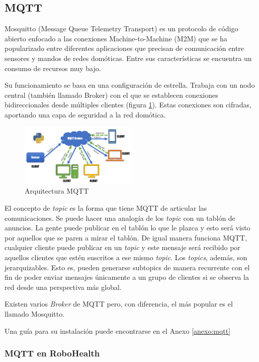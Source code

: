 \subsection{MQTT}

Mosquitto (Message Queue Telemetry Transport) es un protocolo de código abierto enfocado a las conexiones Machine-to-Machine (M2M) \cite{Vega:2016} que se ha popularizado entre diferentes aplicaciones que precisan de comunicación entre sensores y mandos de redes domóticas. Entre sus características se encuentra un consumo de recursos muy bajo.

Su funcionamiento se basa en una configuración de estrella. Trabaja con un nodo central (también llamado Broker) con el que se establecen conexiones bidireccionales desde múltiples clientes (figura \ref{fig:mqtt}). Estas conexiones son cifradas, aportando una capa de seguridad a la red domótica.

\begin{figure}[b]
\centering
\includegraphics[width=0.5\textwidth]{figuras/mqtt.png}
\caption{Arquitectura MQTT}
\label{fig:mqtt}
\end{figure}

El concepto de \textit{topic} es la forma que tiene MQTT de articular las comunicaciones. Se puede hacer una analogía de los \textit{topic} con un tablón de anuncios. La gente puede publicar en el tablón lo que le plazca y esto será visto por aquellos que se paren a mirar el tablón. De igual manera funciona MQTT, cualquier cliente puede publicar en un \textit{topic} y este mensaje será recibido por aquellos clientes que estén suscritos a ese mismo \textit{topic}. Los \textit{topics}, además, son jerarquizables. Esto es, pueden generarse subtopics de manera recurrente con el fin de poder enviar mensajes únicamente a un grupo de clientes si se observa la red desde una perspectiva más global.

Existen varios \textit{Broker} de MQTT pero, con diferencia, el más popular es el llamado Mosquitto.

Una guía para su instalación puede encontrarse en el Anexo \ref{anexo:mqtt}

\subsubsection{MQTT en RoboHealth}

